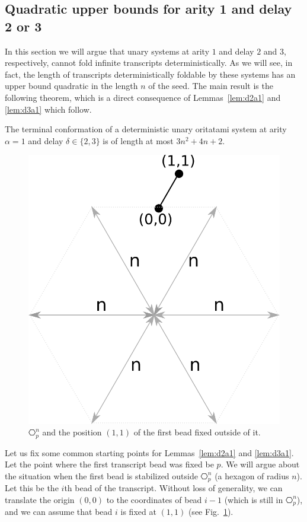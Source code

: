 

\subsection{Quadratic upper bounds for arity 1 and delay 2 or 3}
\label{sec:unary}

In this section we will argue that unary systems at arity $1$ and delay $2$ and $3$, respectively, cannot fold infinite transcripts deterministically. As we will see, in fact, the length of transcripts deterministically foldable by these systems has an upper bound quadratic in the length $n$ of the seed. The main result is the following theorem, which is a direct consequence of Lemmas~\ref{lem:d2a1}  and \ref{lem:d3a1} which follow.
\begin{theorem}[$\delta\in\{ 2,3\}, \alpha = 1$]\label{thm:d23a1}
	The terminal conformation of a deterministic unary oritatami system at arity $\alpha = 1$ and delay $\delta \in \{2,3\}$ is of length at most $3n^2+4n+2$.
\end{theorem}

\begin{figure}
	\centering
	\includegraphics[width=0.4\linewidth]{./Fig/hexagonOut}
	\caption{$\hexagon_p^n$ and the position $(1,1)$ of the first bead fixed outside of it.}
	\label{fig:hexagonOut}
\end{figure}

Let us fix some common starting points for Lemmas~\ref{lem:d2a1} and \ref{lem:d3a1}. Let the point where the first transcript bead was fixed be $p$. We will argue about the situation when the first bead is stabilized outside $\hexagon_p^n$ (a hexagon of radius $n$). Let this be the $i$th bead of the transcript. Without loss of generality, we can translate the origin $(0,0)$ to the coordinates of bead $i-1$ (which is still in $\hexagon_p^n$), and we can assume that bead $i$ is fixed at $(1,1)$ (see Fig.~\ref{fig:hexagonOut}).

